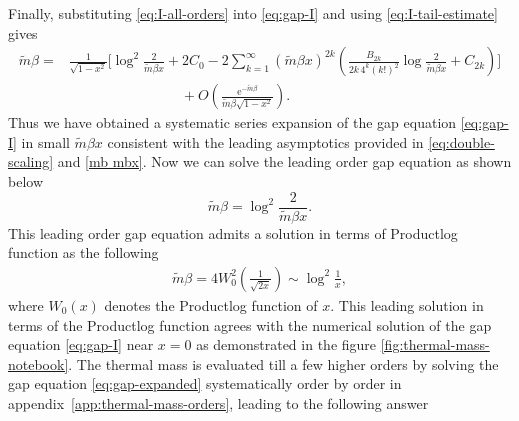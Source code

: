 \documentclass[a4paper,11pt]{article}
\newcommand{\appref}[1]{appendix~\ref{#1}}
\newcommand{\e}{\mathrm e}
\begin{document}
Finally, substituting \eqref{eq:I-all-orders} into \eqref{eq:gap-I} and using
\eqref{eq:I-tail-estimate} gives
\begin{align}
 \tilde m\beta={}&\frac1{\sqrt{1-x^2}}
 \Bigg[
 \log^2\!\frac2{\tilde m\beta x}+2C_0
  -2\sum_{k=1}^{\infty}(\tilde m\beta x)^{2k}
 \left(
 \frac{B_{2k}}{2k\,4^k(k!)^2}\log\!\frac2{\tilde m\beta x}+C_{2k}
 \right)
 \Bigg]
 \nonumber\\
 &\qquad\qquad\qquad\qquad+O\!\left(
 \frac{\e^{-\tilde m\beta}}
 {\tilde m\beta\sqrt{1-x^2}}\right).
 \label{eq:gap-expanded}
\end{align}
Thus we have obtained a systematic series expansion of the gap equation \eqref{eq:gap-I} in small $\tilde m \beta x$ consistent with the leading asymptotics provided in \eqref{eq:double-scaling} and \eqref{mb mbx}. Now we can solve the leading order gap equation as shown below
\begin{equation}
 \tilde m\beta=\log^2\!\frac{2}{\tilde m\beta x}.
 \label{eq:mass-leading-W}
\end{equation}
This leading order gap equation admits a solution in terms of Productlog function as the following
\begin{align}\label{Prodlog}
	\tilde m\beta=4W_0^2\!\left(\frac1{\sqrt{2x}}\right)\sim  \log^2\!\frac1x ,
\end{align}
where $W_0(x)$ denotes the Productlog function of $x$. This leading solution in terms of the Productlog function agrees with the numerical solution of the gap equation \eqref{eq:gap-I} near $x=0$ as demonstrated in the figure \ref{fig:thermal-mass-notebook}. 
The thermal mass is evaluated till a few higher orders by solving the gap equation \eqref{eq:gap-expanded} systematically order by order in \appref{app:thermal-mass-orders}, leading  to the following   answer
%
\end{document}
